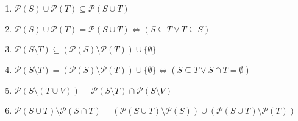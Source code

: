 \documentclass[11pt,a4paper]{article}
\begin{document}
\begin{enumerate}
\item $\displaystyle \mathcal{P}(S) \cup \mathcal{P}(T) \subseteq \mathcal{P}(S \cup T)$
\item $\displaystyle \mathcal{P}(S) \cup \mathcal{P}(T) = \mathcal{P}(S \cup T) \iff (S \subseteq T \lor T \subseteq S)$
\item $\displaystyle \mathcal{P}(S \setminus T) \subseteq (\mathcal{P}(S) \setminus \mathcal{P}(T)) \cup \{\emptyset\}$
\item $\displaystyle \mathcal{P}(S \setminus T) = (\mathcal{P}(S) \setminus \mathcal{P}(T)) \cup \{\emptyset\} \iff (S \subseteq T \lor S \cap T = \emptyset)$
\item $\displaystyle \mathcal{P}(S \setminus (T \cup V)) = \mathcal{P}(S \setminus T) \cap \mathcal{P}(S \setminus V)$
\item $\displaystyle \mathcal{P}(S \cup T) \setminus \mathcal{P}(S \cap T) = (\mathcal{P}(S \cup T) \setminus \mathcal{P}(S)) \cup (\mathcal{P}(S \cup T) \setminus \mathcal{P}(T))$
\end{enumerate}
\end{document}
